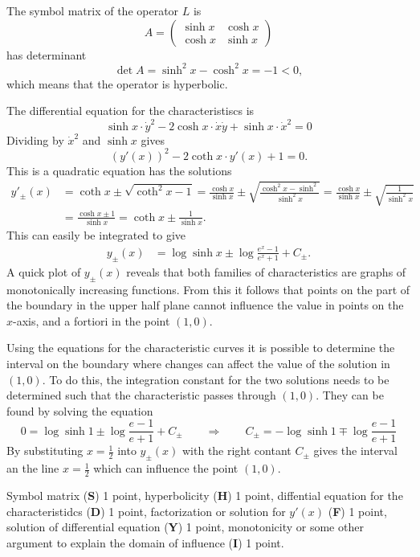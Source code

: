 \begin{loesung}
\begin{teilaufgaben}
\item
The symbol matrix of the operator $L$ is
\[
A=\begin{pmatrix}
\sinh x & \cosh x\\
\cosh x & \sinh x
\end{pmatrix}
\]
has determinant
\[
\det A
=
\sinh^2x-\cosh^2x
=
-1<0,
\]
which means that the operator is hyperbolic.
\item
The differential equation for the characteristiscs is
\[
\sinh x
\cdot
\dot{y}^2
-2
\cosh x
\cdot
\dot{x}\dot{y}
+
\sinh x
\cdot
\dot{x}^2
=
0
\]
Dividing by $\dot{x}^2$ and $\sinh x$ gives
\[
(y'(x))^2
-2
\coth x\cdot y'(x)
+
1
=
0.
\]
This is a quadratic equation has the solutions
\begin{align*}
y'_\pm(x)
&=
\coth x \pm \sqrt{\coth^2 x -1}
=
\frac{\cosh x}{\sinh x}
\pm
\sqrt{
\frac{\cosh^2 x-\sinh^2}{\sinh^2x}
}
=
\frac{\cosh x}{\sinh x}
\pm
\sqrt{\frac{1}{\sinh^2 x}}
\\
&=
\frac{
\cosh x \pm 1
}{
\sinh x
}
=
\coth x \pm \frac{1}{\sinh x}.
\end{align*}
This can easily be integrated to give
\begin{align*}
y_\pm(x)
&=
\log\sinh x \pm \log\frac{e^x-1}{e^x+1} + C_{\pm}.
\end{align*}
A quick plot of $y_{\pm}(x)$ reveals that both families of characteristics
are graphs of monotonically increasing functions.
From this it follows that points on the part of the boundary in the upper
half plane cannot influence the value in points on the $x$-axis, and
a fortiori in the point $(1,0)$.
\qedhere
\end{teilaufgaben}
\end{loesung}

\begin{diskussion}
Using the equations for the characteristic curves it is possible
to determine the interval on the boundary where changes can affect
the value of the solution in $(1,0)$.
To do this, the integration constant for the two solutions needs to
be determined such that the characteristic passes through $(1,0)$.
They can be found by solving the equation
\[
0
=
\log\sinh 1 \pm \log\frac{e-1}{e+1}+C_{\pm}
\qquad\Rightarrow\qquad
C_{\pm}
=
-\log\sinh 1
\mp 
\log\frac{e-1}{e+1}
\]
By substituting
$x=\frac12$ into $y_{\pm}(x)$
with the right contant $C_\pm$ gives the interval an the line
$x=\frac12$ which can influence the point $(1,0)$.
\end{diskussion}

\begin{bewertung}
Symbol matrix ({\bf S}) 1 point,
hyperbolicity ({\bf H}) 1 point,
diffential equation for the characteristidcs ({\bf D}) 1 point,
factorization or solution for $y'(x)$ ({\bf F}) 1 point,
solution of differential equation ({\bf Y}) 1 point,
monotonicity or some other argument to explain the domain of influence
({\bf I}) 1 point.
\end{bewertung}
